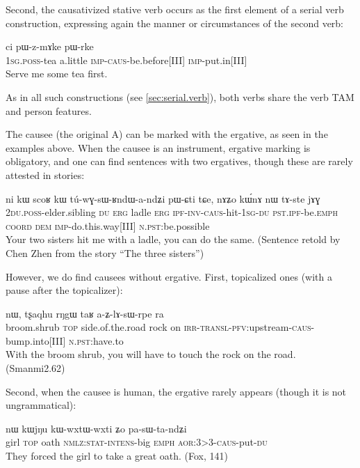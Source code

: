 \documentclass[oldfontcommands,oneside,a4paper,11pt]{memoir}
\newcommand{\ipa}[1]{{\phon #1}} %
\newcommand{\wav}[1]{}%
\newcommand{\aor}{\textsc{aor}}
\newcommand{\caus}{\textsc{caus}}
\newcommand{\coord}{\textsc{coord}}
\newcommand{\dem}{\textsc{dem}}
\newcommand{\du}{\textsc{du}}
\newcommand{\erg}{\textsc{erg}}
\newcommand{\emphat}{\textsc{emph}}
\newcommand{\imp}{\textsc{imp}}
\newcommand{\intens}{\textsc{intens}}
\newcommand{\inv}{\textsc{inv}}
\newcommand{\ipf}{\textsc{ipf}}
\newcommand{\irr}{\textsc{irr}}
\newcommand{\nmlz}{\textsc{nmlz}}
\newcommand{\npst}{\textsc{n.pst}}
\newcommand{\pfv}{\textsc{pfv}}
\newcommand{\poss}{\textsc{poss}}
\newcommand{\pst}{\textsc{pst}}
\newcommand{\sg}{\textsc{sg}}
\newcommand{\stat}{\textsc{stat}}
\newcommand{\topic}{\textsc{top}}
\newcommand{\transloc}{\textsc{transl}}
\begin{document}
Second, the causativized stative verb occurs as the first element of a serial verb construction, expressing again the manner or circumstances of the second verb:

\begin{exe}
\ex
\gll \ipa{a-tʂha} 	\ipa{ci} 	\ipa{pɯ-z-mɤke} 	\ipa{pɯ-rke} \\
1\sg{}.\poss{}-tea a.little \imp{}-\caus{}-be.before[III] \imp{}-put.in[III] \\
\glt  Serve me some tea first.
\end{exe} 
As in all such constructions (see \ref{sec:serial.verb}), both verbs share the verb TAM and person features.

 
The causee (the original A) can be marked with the ergative, as seen in the examples above. When the causee is an instrument, ergative marking is obligatory, and one can find sentences with two ergatives, though these are rarely attested in stories:
\begin{exe}
\ex
\gll \ipa{nɤ-pi} 	\ipa{ni} 	\ipa{kɯ} 	\ipa{scoʁ} 	\ipa{kɯ} 	\ipa{tú-wɣ-sɯ-ʁndɯ-a-ndʑi} 	\ipa{pɯ-ɕti} 	\ipa{tɕe,} 	\ipa{nɤʑo} 	\ipa{kɯ́nɤ} 	\ipa{nɯ} 	\ipa{tɤ-ste} 	\ipa{jɤɣ}  \\
2\du{}.\poss{}-elder.sibling \du{} \erg{} ladle \erg{} \ipf{}-\inv{}-\caus{}-hit-1\sg{}-\du{} \pst{}.\ipf{}-be.\emphat{} \coord{} \dem{} \imp{}-do.this.way[III] \npst{}:be.possible  \\
\glt   Your two sisters hit me with a ladle, you can do the same. (Sentence retold by Chen Zhen from the story ``The three sisters'') \wav{8_scoRkW}
\end{exe} 


However, we do find  causees without ergative. First, topicalized ones (with a pause after the topicalizer):
\begin{exe}
\ex
\gll  \ipa{phuɲi} 	\ipa{nɯ}, 	\ipa{tʂaqhu} 	\ipa{rŋgɯ} 	\ipa{taʁ} 	\ipa{a-ʑ-lɤ-sɯ-rpe} 	\ipa{ra}  \\
 broom.shrub \topic{} side.of.the.road rock on \irr{}-\transloc{}-\pfv{}:upstream-\caus{}-bump.into[III] \npst{}:have.to   \\
 \glt   With the broom shrub, you will have to touch the rock on the road. (Smanmi2.62)
\end{exe} 
 

 
Second, when the causee is human, the ergative rarely appears (though it is not ungrammatical): 
 
 \begin{exe}
\ex
\gll \ipa{tɕheme} 	\ipa{nɯ} 	\ipa{kɯjŋu} 	\ipa{kɯ-wxtɯ-wxti} 	\ipa{ʑo} 	\ipa{pa-sɯ-ta-ndʑi} \\
girl \topic{} oath \nmlz{}:\stat{}-\intens{}-big \emphat{} \aor{}:3>3-\caus{}-put-\du{} \\
 \glt   They forced the girl to take a great oath. (Fox, 141)
\end{exe} 
  
\end{document}
